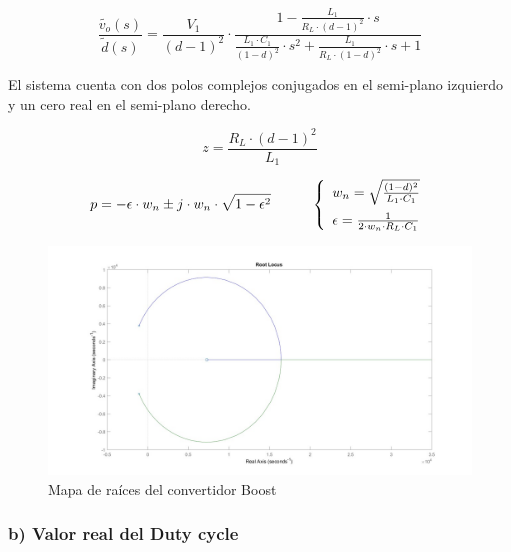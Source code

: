\documentclass[e4_tp2_main.tex]{subfiles}
\begin{document}
\vspace{0.5cm}

\begin{equation}
\frac{ \widetilde{v_o}(s)}{\widetilde{d}(s)}= \frac{V_1}{(d-1)^2} \cdot
 \frac{ 1 - \frac{L_1}{R_L \cdot (d-1)^2} \cdot s}{ \frac{L_1 \cdot C_1}{(1-d)^2} \cdot s^2 +\frac{L_1}{R_L \cdot (1-d)^2 }\cdot s + 1}
\end{equation}

El sistema cuenta con dos polos complejos conjugados en el semi-plano izquierdo y un cero real en el semi-plano derecho.

\begin{equation}
z=\frac{R_L \cdot (d-1)^2}{L_1}
\end{equation}



\begin{equation}
p= - \epsilon \cdot w_n \pm j \cdot w_n \cdot \sqrt{1-{\epsilon}^2 } \hspace{1cm} \left\lbrace
\begin{array}{ll}
w_n=\sqrt{\frac{(1-d)^2}{L_1 \cdot C_1}} \vspace{0.2cm} \\
\epsilon= \frac{1}{2 \cdot w_n \cdot R_L \cdot C_1}
\end{array}
\right.
\end{equation}

  \begin{figure}[H]
  \centering
    \includegraphics[scale=0.3]{Imagenes/Punto1/rootlocus_Convertidor.jpeg}
    \caption{ Mapa de raíces del convertidor Boost}
  \end{figure}


\subsubsection*{b) Valor real del Duty cycle}
\end{document}
